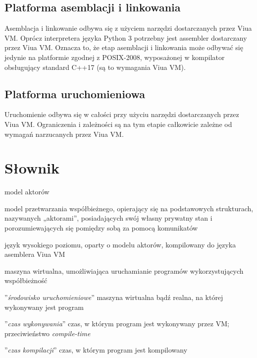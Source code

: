 \documentclass[11pt,oneside,a4paper,titlepage,onecolumn]{article}
\begin{document}
\subsection{Platforma asemblacji i linkowania}

Asemblacja i linkowanie odbywa się z użyciem narzędzi dostarczanych przez Viua VM.
Oprócz interpretera języka Python 3 potrzebny jest assembler dostarczany przez Viua VM. Oznacza to, że etap
asemblacji i linkowania może odbywać się jedynie na platformie zgodnej z POSIX-2008, wyposażonej w kompilator
obsługujący standard C++17 (są to wymagania Viua VM).

\subsection{Platforma uruchomieniowa}

Uruchomienie odbywa się w całości przy użyciu narzędzi dostarczanych przez Viua VM.
Ograniczenia i zależności są na tym etapie całkowicie zależne od wymagań narzucanych przez Viua VM.

\newpage
\section{Słownik}

\begin{labeling}{model aktorów}
    \item [model aktorów] model przetwarzania współbieżnego, opierający się na
        podstawowych strukturach, nazywanych „aktorami”, posiadających swój
        własny prywatny stan i porozumiewających się pomiędzy sobą za pomocą
        komunikatów
    \item [ViuAct] język wysokiego poziomu, oparty o modelu aktorów, kompilowany
        do języka asemblera Viua VM
    \item [Viua VM] maszyna wirtualna, umożliwiająca uruchamianie programów
        wykorzystujących współbieżność
    \item[runtime] ''\emph{środowisko uruchomieniowe}'' maszyna wirtualna bądź realna, na której
        wykonywany jest program
    \item[\emph{run-time}] ''\emph{czas wykonywania}'' czas, w którym program jest wykonywany przez VM;
        przeciwieństwo \emph{compile-time}
    \item[\emph{compile-time}] ''\emph{czas kompilacji}'' czas, w którym program jest kompilowany
\end{labeling}
\end{document}
